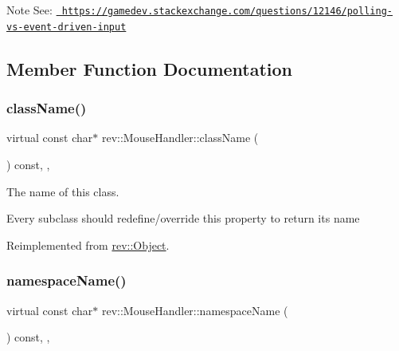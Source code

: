 \begin{DoxyNote}{Note}
See\+: \href{https://gamedev.stackexchange.com/questions/12146/polling-vs-event-driven-input}{\texttt{ https\+://gamedev.\+stackexchange.\+com/questions/12146/polling-\/vs-\/event-\/driven-\/input}} 
\end{DoxyNote}


\subsection{Member Function Documentation}
\mbox{\label{classrev_1_1_mouse_handler_ace8eaee7d8e16bfe3636c7d85615c075}} 
\subsubsection{\texorpdfstring{className()}{className()}}
{\footnotesize\ttfamily virtual const char$\ast$ rev\+::\+Mouse\+Handler\+::class\+Name (\begin{DoxyParamCaption}{ }\end{DoxyParamCaption}) const\hspace{0.3cm}{\ttfamily [inline]}, {\ttfamily [override]}, {\ttfamily [virtual]}}



The name of this class. 

Every subclass should redefine/override this property to return its name 

Reimplemented from \mbox{\hyperlink{classrev_1_1_object_a7a2013f91169479b65cf93afdc5d9a68}{rev\+::\+Object}}.

\mbox{\label{classrev_1_1_mouse_handler_ad140db2a92a48fa1b1f70f0823a5ea16}} 
\subsubsection{\texorpdfstring{namespaceName()}{namespaceName()}}
{\footnotesize\ttfamily virtual const char$\ast$ rev\+::\+Mouse\+Handler\+::namespace\+Name (\begin{DoxyParamCaption}{ }\end{DoxyParamCaption}) const\hspace{0.3cm}{\ttfamily [inline]}, {\ttfamily [override]}, {\ttfamily [virtual]}}



